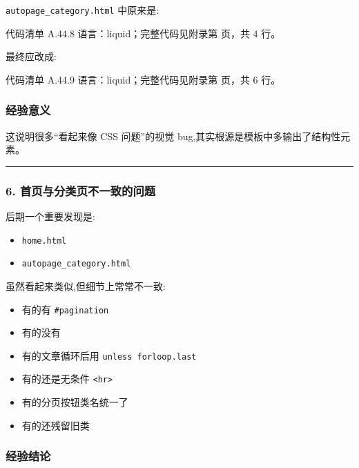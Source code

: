 \documentclass[lang=cn,scheme=chinese,color=blue,device=normal,toc=onecol,math=cm]{elegantbook}
\begin{document}
\texttt{autopage\_\allowbreak{}category.html} 中原来是:\par


\begin{codeindexbox}{代码清单 A.44.8}
语言：liquid；完整代码见附录第 \pageref{code:44:8} 页，共 4 行。
\end{codeindexbox}


最终应改成:\par


\begin{codeindexbox}{代码清单 A.44.9}
语言：liquid；完整代码见附录第 \pageref{code:44:9} 页，共 6 行。
\end{codeindexbox}


\subsubsection{经验意义}


这说明很多“看起来像 CSS 问题”的视觉 bug,其实根源是模板中多输出了结构性元素。\par


\medskip\hrule\medskip


\subsubsection{6. 首页与分类页不一致的问题}


后期一个重要发现是:\par


\begin{itemize}
\item \texttt{home.html}
\item \texttt{autopage\_\allowbreak{}category.html}
\end{itemize}


虽然看起来类似,但细节上常常不一致:\par


\begin{itemize}
\item 有的有 \texttt{\#pagination}
\item 有的没有
\item 有的文章循环后用 \texttt{unless forloop.last}
\item 有的还是无条件 \texttt{<hr>}
\item 有的分页按钮类名统一了
\item 有的还残留旧类
\end{itemize}


\subsubsection{经验结论}
\end{document}
